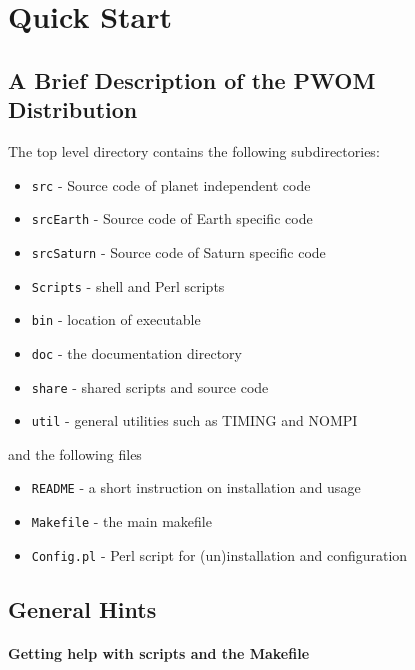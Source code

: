 
\chapter{Quick Start}

\section{A Brief Description of the PWOM Distribution}

The top level directory contains the following subdirectories:
\begin{itemize}
\item {\tt src}       - Source code of planet independent code
\item {\tt srcEarth}  - Source code of Earth specific code      
\item {\tt srcSaturn} - Source code of Saturn specific code 
\item {\tt Scripts}   - shell and Perl scripts
\item {\tt bin}       - location of executable
\item {\tt doc}       - the documentation directory 
\item {\tt share}     - shared scripts and source code
\item {\tt util}      - general utilities such as TIMING and NOMPI
\end{itemize}
and the following files
\begin{itemize}
\item {\tt README}        - a short instruction on installation and usage
\item {\tt Makefile}      - the main makefile
\item {\tt Config.pl}     - Perl script for (un)installation and configuration
\end{itemize}

\section{General Hints}

\subsubsection{Getting help with scripts and the Makefile}

